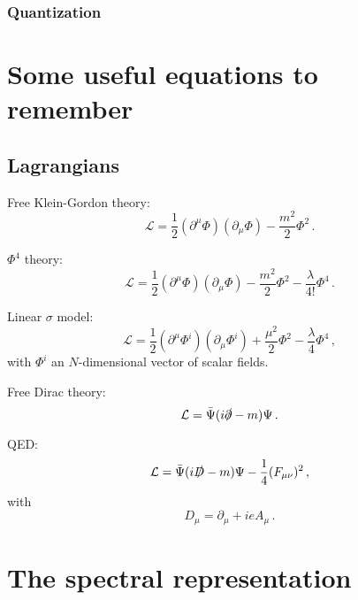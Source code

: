 \documentclass[12pt]{memoir}
\begin{document}
\subsection{Quantization}


\begin{appendices}
  \chapter{Some useful equations to remember}

  \section{Lagrangians}

  Free Klein-Gordon theory:
  \begin{equation}\label{eq:kg_free}
    \mathcal{L} = \frac{1}{2}(\partial^{\mu} \Phi)(\partial_{\mu} \Phi) - \frac{m^2}{2} \Phi^2\,.
  \end{equation}

  $\Phi^4$ theory:
  \begin{equation}\label{eq:phi4}
    \mathcal{L} = \frac{1}{2}(\partial^{\mu} \Phi)(\partial_{\mu} \Phi) - \frac{m^2}{2} \Phi^2 - \frac{\lambda}{4!} \Phi^4\,.
  \end{equation}

  Linear $\sigma$ model:
  \begin{equation}\label{eq:linear_sigma_model}
    \mathcal{L} = \frac{1}{2}(\partial^{\mu} \Phi^i)(\partial_{\mu} \Phi^i) + \frac{\mu^2}{2} \Phi^2 - \frac{\lambda}{4} \Phi^4\,,
  \end{equation}
  with $\Phi^i$ an $N$-dimensional vector of scalar fields.

  Free Dirac theory:
  \begin{equation}\label{eq:dirac_free}
    \mathcal{L} = \bar{\Psi}(i\slashed{\partial} - m)\Psi\,.
  \end{equation}

  QED:
  \begin{equation}\label{eq:qed}
    \mathcal{L} = \bar{\Psi}(i\slashed{D} - m)\Psi - \frac{1}{4}(F_{\mu\nu})^2 \,,
  \end{equation}
  with
  \begin{equation}\label{eq:qed_cov_deriv}
    D_{\mu} = \partial_{\mu} + i e A_{\mu}\,.
  \end{equation}

  \chapter{The spectral representation}

\end{appendices}

\backmatter{}

\nocite{*} %

\end{document}
